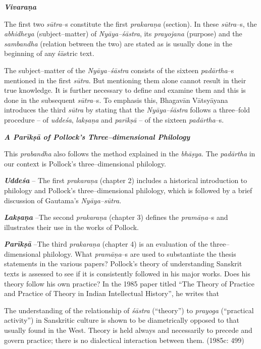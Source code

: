 \textit{\textbf{Vivaraṇa}}

The first two \textit{sūtra}–s constitute the first \textit{prakaraṇa} (section). In these \textit{sūtra}–s, the \textit{abhidheya} (subject–matter) of \textit{Nyāya–śāstra}, its \textit{prayojana} (purpose) and the \textit{sambandha} (relation between the two) are stated as is usually done in the beginning of any śāstric text.

The subject–matter of the \textit{Nyāya–śāstra} consists of the sixteen \textit{padārtha}–s mentioned in the first \textit{sūtra}. But mentioning them alone cannot result in their true knowledge. It is further necessary to define and examine them and this is done in the subsequent \textit{sūtra}–s. To emphasis this, Bhagavān Vātsyāyana introduces the third \textit{sūtra} by stating that the \textit{Nyāya–śāstra} follows a three–fold procedure – of \textit{uddeśa}, \textit{lakṣaṇa} and \textit{parīkṣā} – of the sixteen \textit{padārtha}–s.

\textbf{\textit{A Parīkṣā of Pollock’s Three–dimensional Philology}}

This \textit{prabandha} also follows the method explained in the \textit{bhāṣya}. The \textit{padārtha} in our context is Pollock’s three–dimensional philology.

\textit{\textbf{Uddeśa }} – The first \textit{prakaraṇa} (chapter 2) includes a historical introduction to philology and Pollock’s three–dimensional philology, which is followed by a brief discussion of Gautama’s \textit{Nyāya–sūtra}.

\textit{\textbf{Lakṣaṇa }} –The second \textit{prakaraṇa} (chapter 3) defines the \textit{pramāṇa}–s and illustrates their use in the works of Pollock.

\textit{\textbf{Parīkṣā }} –The third \textit{prakaraṇa} (chapter 4) is an evaluation of the three–dimensional philology. What \textit{pramāṇa}–s are used to substantiate the thesis statements in the various papers? Pollock’s theory of understanding Sanskrit texts is assessed to see if it is consistently followed in his major works. Does his theory follow his own practice? In the 1985 paper titled “The Theory of Practice and Practice of Theory in Indian Intellectual History”, he writes that

\begin{myquote}
The understanding of the relationship of \textit{śāstra} (“theory”) to \textit{prayoga} (“practical activity”) in Sanskritic culture is shown to be diametrically opposed to that usually found in the West. Theory is held always and necessarily to precede and govern practice; there is no dialectical interaction between them. (1985c: 499)
\end{myquote}

